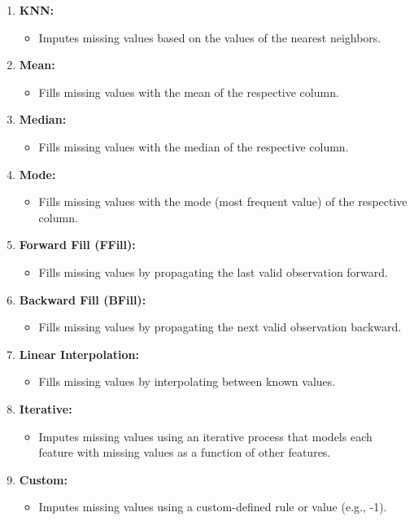 \documentclass[12pt,letterpaper]{article}
\begin{document}
\begin{enumerate}
    \item \textbf{KNN:}
    \begin{itemize}
        \item Imputes missing values based on the values of the nearest neighbors.
    \end{itemize}

    \item \textbf{Mean:}
    \begin{itemize}
        \item Fills missing values with the mean of the respective column.
    \end{itemize}

    \item \textbf{Median:}
    \begin{itemize}
        \item Fills missing values with the median of the respective column.
    \end{itemize}

    \item \textbf{Mode:}
    \begin{itemize}
        \item Fills missing values with the mode (most frequent value) of the respective column.
    \end{itemize}

    \item \textbf{Forward Fill (FFill):}
    \begin{itemize}
        \item Fills missing values by propagating the last valid observation forward.
    \end{itemize}

    \item \textbf{Backward Fill (BFill):}
    \begin{itemize}
        \item Fills missing values by propagating the next valid observation backward.
    \end{itemize}

    \item \textbf{Linear Interpolation:}
    \begin{itemize}
        \item Fills missing values by interpolating between known values.
    \end{itemize}

    \item \textbf{Iterative:}
    \begin{itemize}
        \item Imputes missing values using an iterative process that models each feature with missing values as a function of other features.
    \end{itemize}

    \item \textbf{Custom:}
    \begin{itemize}
        \item Imputes missing values using a custom-defined rule or value (e.g., -1).
    \end{itemize}
\end{enumerate}
\end{document}
